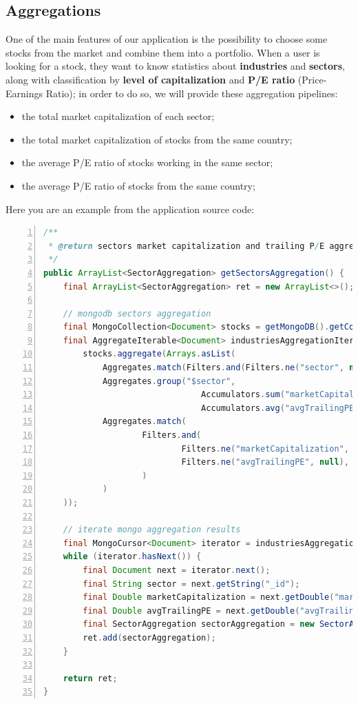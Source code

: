 \subsection{Aggregations}
One of the main features of our application is the possibility to choose some
stocks from the market and combine them into a portfolio. When a user is looking
for a stock, they want to know statistics about \textbf{industries} and
\textbf{sectors}, along with classification by \textbf{level of capitalization}
and \textbf{P/E ratio} (Price-Earnings Ratio); in order to do so, we will
provide these aggregation pipelines:
\begin{itemize}
    \item the total market capitalization of each sector;
    \item the total market capitalization of stocks from the same country;
    \item the average P/E ratio of stocks working in the same sector;
    \item the average P/E ratio of stocks from the same country;
\end{itemize}
Here you are an example from the application source code:
\begin{lstlisting}[basicstyle=\footnotesize,language=Java,numbers=left,
    numberstyle=\footnotesize,numbersep=4pt,frame=single]
/**
 * @return sectors market capitalization and trailing P/E aggregation.
 */
public ArrayList<SectorAggregation> getSectorsAggregation() {
    final ArrayList<SectorAggregation> ret = new ArrayList<>();

    // mongodb sectors aggregation
    final MongoCollection<Document> stocks = getMongoDB().getCollection(StocksimCollection.STOCKS.getCollectionName());
    final AggregateIterable<Document> industriesAggregationIterable =
        stocks.aggregate(Arrays.asList(
            Aggregates.match(Filters.and(Filters.ne("sector", null), Filters.ne("sector", ""))),
            Aggregates.group("$sector",
                                Accumulators.sum("marketCapitalization", "$marketCap"),
                                Accumulators.avg("avgTrailingPE", "$trailingPE")),
            Aggregates.match(
                    Filters.and(
                            Filters.ne("marketCapitalization", null), Filters.ne("marketCapitalization", ""),
                            Filters.ne("avgTrailingPE", null), Filters.ne("avgTrailingPE", "")
                    )
            )
    ));

    // iterate mongo aggregation results
    final MongoCursor<Document> iterator = industriesAggregationIterable.iterator();
    while (iterator.hasNext()) {
        final Document next = iterator.next();
        final String sector = next.getString("_id");
        final Double marketCapitalization = next.getDouble("marketCapitalization");
        final Double avgTrailingPE = next.getDouble("avgTrailingPE");
        final SectorAggregation sectorAggregation = new SectorAggregation(sector, marketCapitalization, avgTrailingPE);
        ret.add(sectorAggregation);
    }

    return ret;
}
\end{lstlisting}
